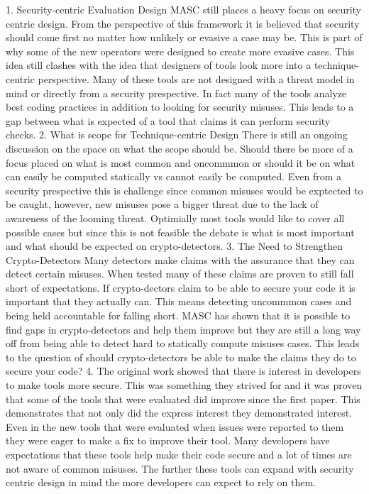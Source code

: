 1. Security-centric Evaluation Design
MASC still places a heavy focus on security centric design. From the perspective of this framework it is believed that security should come first no matter how unlikely or evasive a case may be. This is part of why some of the new operators were designed to create more evasive cases. This idea still clashes with the idea that designers of tools look more into a technique-centric perspective. Many of these tools are not designed with a threat model in mind or directly from a security prespective. In fact many of the tools analyze best coding practices in addition to looking for security misuses. This leads to a gap between what is expected of a tool that claims it can perform security checks.
2. What is scope for Technique-centric Design
There is still an ongoing discussion on the space on what the scope should be. Should there be more of a focus placed on what is most common and oncommmon or should it be on what can easily be computed statically vs cannot easily be computed. Even from a security prespective this is challenge since common misuses would be exptected to be caught, however, new misuses pose a bigger threat due to the lack of awareness of the looming threat. Optimially most tools would like to cover all possible cases but since this is not feasible the debate is what is most important and what should be expected on crypto-detectors.
3. The Need to Strengthen Crypto-Detectors
Many detectors make claims with the assurance that they can detect certain misuses. When tested many of these claims are proven to still fall short of expectations. If crypto-dectors claim to be able to secure your code it is important that they actually can. This means detecting uncommmon cases and being held accountable for falling short. MASC has shown that it is possible to find gaps in crypto-detectors and help them improve but they are still a long way off from being able to detect hard to statically compute misuses cases. This leads to the question of should crypto-detectors be able to make the claims they do to secure your code?
4. The original work showed that there is interest in developers to make tools more secure. This was something they strived for and it was proven that some of the tools that were evaluated did improve since the first paper. This demonstrates that not only did the express interest they demonstrated interest. Even in the new tools that were evaluated when issues were reported to them they were eager to make a fix to improve their tool. Many developers have expectations that these tools help make their code secure and a lot of times are not aware of common misuses. The further these tools can expand with security centric design in mind the more developers can expect to rely on them.
